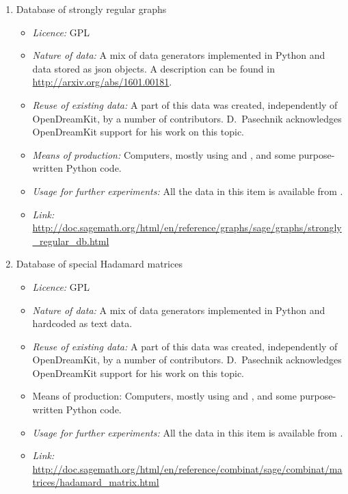 \documentclass{../../Proposal/LaTeX-proposal/deliverablereport}
\begin{document}
\begin{description}
\begin{enumerate}
\begin{itemize}
\end{itemize}


\item{Database of strongly regular graphs}
\begin{itemize}
\item\textit{Licence:}  GPL
\item\textit{Nature of data:} A mix of data generators implemented in Python and
data stored as json objects. A description can be found in \href{http://arxiv.org/abs/1601.00181}{http://arxiv.org/abs/1601.00181}.
\item\textit{Reuse of existing data:} A part of this data was created,
  independently of OpenDreamKit, by a number of \Sage contributors.
D.~Pasechnik acknowledges OpenDreamKit support for his work on this topic.
\item\textit{Means of production:} Computers, mostly using \Sage and \GAP, and some purpose-written
Python code.
\item\textit{Usage for further experiments:} All the data  in this item is available from \Sage.
\item\textit{Link:} \url{http://doc.sagemath.org/html/en/reference/graphs/sage/graphs/strongly_regular_db.html}
\end{itemize}


\item{Database of special Hadamard matrices}
\begin{itemize}
\item\textit{Licence:} GPL
\item\textit{Nature of data:} A mix of data generators implemented in Python and hardcoded as text data.
\item\textit{Reuse of existing data:} A part of this data was created, independently of OpenDreamKit, by
a number of \Sage contributors.
D.~Pasechnik acknowledges OpenDreamKit support for his work on this topic.
\item{Means of production:} Computers, mostly using \Sage and \GAP, and some purpose-written
Python code.
\item\textit{Usage for further experiments:} All the data  in this item is available from \Sage.
\item\textit{Link:} \url{http://doc.sagemath.org/html/en/reference/combinat/sage/combinat/matrices/hadamard_matrix.html}
\end{itemize}
\end{enumerate}
\end{description}
\end{document}
